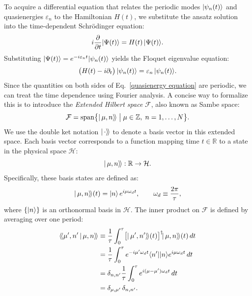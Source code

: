 To acquire a differential equation that relates the periodic modes $|\psi_n(t)\rangle$ and quasienergies $\varepsilon_n$ to the Hamiltonian $H(t)$, we substitute the ansatz solution into the time-dependent Schrödinger equation:
\begin{equation}
    i\frac{\partial}{\partial t}|\Psi(t)\rangle = H(t)\,|\Psi(t)\rangle.
\end{equation}
Substituting $|\Psi(t)\rangle = e^{-i\varepsilon_n t} |\psi_n(t)\rangle$ yields the Floquet eigenvalue equation:
\begin{equation}
    \label{quasienergy equation}
    \bigl(H(t)-i\partial_{t}\bigr)\,|\psi_n(t)\rangle = \varepsilon_n\,|\psi_n(t)\rangle.
\end{equation}
Since the quantities on both sides of Eq.~\eqref{quasienergy equation} are periodic, we can treat the time dependence using Fourier analysis. A concise way to formalize this is to introduce the \emph{Extended Hilbert space} $\mathcal{F}$, also known as Sambe space:
\begin{equation}
    \mathcal{F} = \mathrm{span}\bigl\{|\,\mu,n\rangle\!\rangle \;\big|\; \mu\in\mathbb{Z},\; n=1,\dots,N\bigr\}.
\end{equation}
We use the double ket notation $|\,\cdot\rangle\!\rangle$ to denote a basis vector in this extended space. Each basis vector corresponds to a function mapping time $t \in \mathbb{R}$ to a state in the physical space $\mathcal{H}$:
\begin{equation}
    |\,\mu,n\rangle\!\rangle : \mathbb{R} \rightarrow \mathcal{H}.
\end{equation}
Specifically, these basis states are defined as:
\begin{equation}
    |\,\mu,n\rangle\!\rangle(t) = |n\rangle\,e^{i\mu\omega_d t}, \qquad \omega_d \equiv \frac{2\pi}{\tau},
\end{equation}
where $\{|n\rangle\}$ is an orthonormal basis in $\mathcal{H}$. The inner product on $\mathcal{F}$ is defined by averaging over one period:
\begin{align}
    \langle\!\langle\mu',n'\,|\,\mu,n\rangle\!\rangle
    &\equiv \frac{1}{\tau}\int_{0}^{\tau}
    \bigl[|\,\mu',n'\rangle\!\rangle(t)\bigr]^\dagger \!|\,\mu,n\rangle\!\rangle(t)\,dt \nonumber\\
    &= \frac{1}{\tau}\int_{0}^{\tau} e^{-i\mu'\omega_d t}\langle n'||n\rangle e^{i\mu\omega_d t}\,dt \nonumber\\
    &= \delta_{n,n'} \frac{1}{\tau}\int_{0}^{\tau} e^{i(\mu-\mu')\omega_d t}\,dt \nonumber\\
    &= \delta_{\mu,\mu'}\,\delta_{n,n'}.
\end{align}
